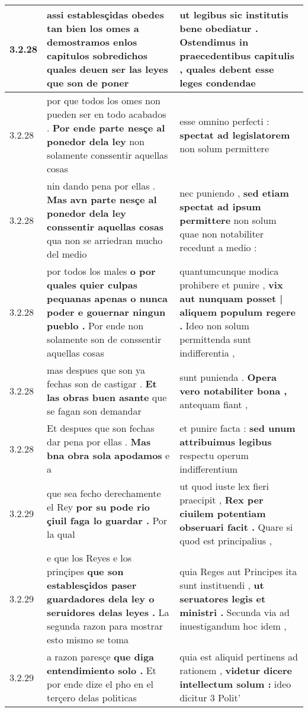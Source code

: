 \begin{tabular}{|p{1cm}|p{6.5cm}|p{6.5cm}|}
3.2.28 & assi establesçidas obedes tan bien los omes \textbf{ a demostramos enlos capitulos sobredichos quales deuen ser las leyes } que son de poner & ut legibus sic institutis bene obediatur . \textbf{ Ostendimus in praecedentibus capitulis , } quales debent esse leges condendae \\\hline
3.2.28 & por que todos los omes non pueden ser en todo acabados . \textbf{ Por ende parte nesçe al ponedor dela ley } non solamente conssentir aquellas cosas & esse omnino perfecti : \textbf{ spectat ad legislatorem } non solum permittere \\\hline
3.2.28 & nin dando pena por ellas . \textbf{ Mas avn parte nesçe al ponedor dela ley conssentir aquellas cosas } qua non se arriedran mucho del medio & nec puniendo , \textbf{ sed etiam spectat ad ipsum permittere } non solum quae non notabiliter recedunt a medio : \\\hline
3.2.28 & por todos los males \textbf{ o por quales quier culpas pequanas apenas o nunca poder e gouernar ningun pueblo . } Por ende non solamente son de conssentir aquellas cosas & quantumcunque modica prohibere et punire , \textbf{ vix aut nunquam posset | aliquem populum regere . } Ideo non solum permittenda sunt indifferentia , \\\hline
3.2.28 & mas despues que son ya fechas son de castigar . \textbf{ Et las obras buen asante } que se fagan son demandar & sunt punienda . \textbf{ Opera vero notabiliter bona , } antequam fiant , \\\hline
3.2.28 & Et despues que son fechas dar pena por ellas . \textbf{ Mas bna obra sola apodamos } e a & et punire facta : \textbf{ sed unum attribuimus legibus } respectu operum indifferentium \\\hline
3.2.29 & que sea fecho derechamente el Rey \textbf{ por su pode rio çiuil faga lo guardar . } Por la qual & ut quod iuste lex fieri praecipit , \textbf{ Rex per ciuilem potentiam obseruari facit . } Quare si quod est principalius , \\\hline
3.2.29 & e que los Reyes e los prinçipes \textbf{ que son establesçidos paser guardadores dela ley o seruidores delas leyes . } La segunda razon para mostrar esto mismo se toma & quia Reges aut Principes ita sunt instituendi , \textbf{ ut seruatores legis et ministri . } Secunda via ad inuestigandum hoc idem , \\\hline
3.2.29 & a razon paresçe \textbf{ que diga entendimiento solo . } Et por ende dize el pho en el terçero delas politicas & quia est aliquid pertinens ad rationem , \textbf{ videtur dicere intellectum solum : } ideo dicitur 3 Polit’ \\\hline

\end{tabular}
